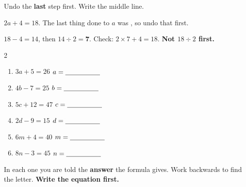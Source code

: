 \documentclass[12pt,a4paper]{article}
\begin{document}

\noindent Undo the \textbf{last} step first. Write the middle line.

\begin{remember}
  $2a + 4 = 18$. The last thing done to $a$ was , so undo that first.

  \smallskip
  \hspace*{1.2em}$18 - 4 = 14$, \; then $14 \div 2 = \mathbf{7}$. \quad
  Check: $2 \times 7 + 4 = 18$. \;
  {\color{cbred}\bfseries Not $18 \div 2$ first.}
\end{remember}

\vspace{2pt}
\begin{multicols}{2}
\begin{enumerate}[label=(\alph*), itemsep=11pt]
  \item $3a + 5 = 26$ \hfill $a = \blank[1.8cm]$
  \item $4b - 7 = 25$ \hfill $b = \blank[1.8cm]$
  \item $5c + 12 = 47$ \hfill $c = \blank[1.8cm]$
  \item $2d - 9 = 15$ \hfill $d = \blank[1.8cm]$
  \item $6m + 4 = 40$ \hfill $m = \blank[1.8cm]$
  \item $8n - 3 = 45$ \hfill $n = \blank[1.8cm]$
\end{enumerate}
\end{multicols}


\noindent In each one you are told the \textbf{answer} the formula gives. Work
backwards to find the letter. \textbf{Write the equation first.}
\end{document}
